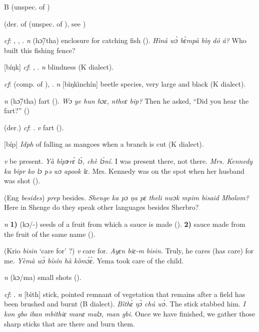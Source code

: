\begin{letter}{B}
 (unspec. of )

 (der. of  (unspec. of ), see ) 

 \textit{cf}: , , . \textit{n} (hɔ̃/tha) enclosure for catching fish (\citealt{Pichl1967}). \textit{Hìná wɔ̀ bɛ̀mpà bìŋ dó á?} Who built this fishing fence?

 [bíŋk] \textit{cf}: , . \textit{n} blindness (K dialect). 

 \textit{cf}:  (comp. of ), . \textit{n} [bìŋkìnchín] beetle species, very large and black (K dialect).

 \textit{n} (hɔ̃/tha) fart (\citealt{Pichl1967}). \textit{Wɔ ye hun hɔɛ, ntheɛ bip?} Then he asked, “Did you hear the fart?” (\citealt{Pichl1967})

 (der.) \textit{cf}: . \textit{v} fart (\citealt{Pichl1967}).

 [bíp] \textit{Idph} of falling as mangoes when a branch is cut (K dialect).

 \textit{v} be present. \textit{Yà bìpɝrɛ́ lɔ̀, chè lɔ́ní.} I was present there, not there. \textit{Mrs. Kennedy ka bipr ko lɔ pə wɔ apook lɛ.} Mrs. Kennedy was on the spot when her husband was shot (\citealt{Pichl1967}). 

 (Eng \textit{besides}) \textit{prep} besides. \textit{Shenge ka pɔ ŋa pɛ theli nwɔk mpim bisaid Mbolom?} Here in Shenge do they speak other languages besides Sherbro?

 \textit{n} \textbf{1)} (kɔ/-) seeds of a fruit from which a sauce is made (\citealt{Pichl1967}). \textbf{2)} sauce made from the fruit of the same name (\citealt{Pichl1967}).

 (Krio \textit{bisin} ‘care for' ?) \textit{v} care for. \textit{Ayɛn biɛ-m bisin.} Truly, he cares (has care) for me. \textit{Yèmà wɔ̀ bísín hà kòmɔ́ɛ́.} Yema took care of the child.

 \textit{n} (kɔ/ma) small shots (\citealt{Pichl1967}).

 \textit{cf}: . \textit{n} [bìth] stick, pointed remnant of vegetation that remains after a field has been brushed and burnt (B dialect). \textit{Bìthɛ̀ ŋɔ̀ chú wɔ̀.} The stick stabbed him. \textit{I kon gbo iban mbithiɛ manɛ malɔ, man gbi.} Once we have finished, we gather those sharp sticks that are there and burn them.


\end{letter}
